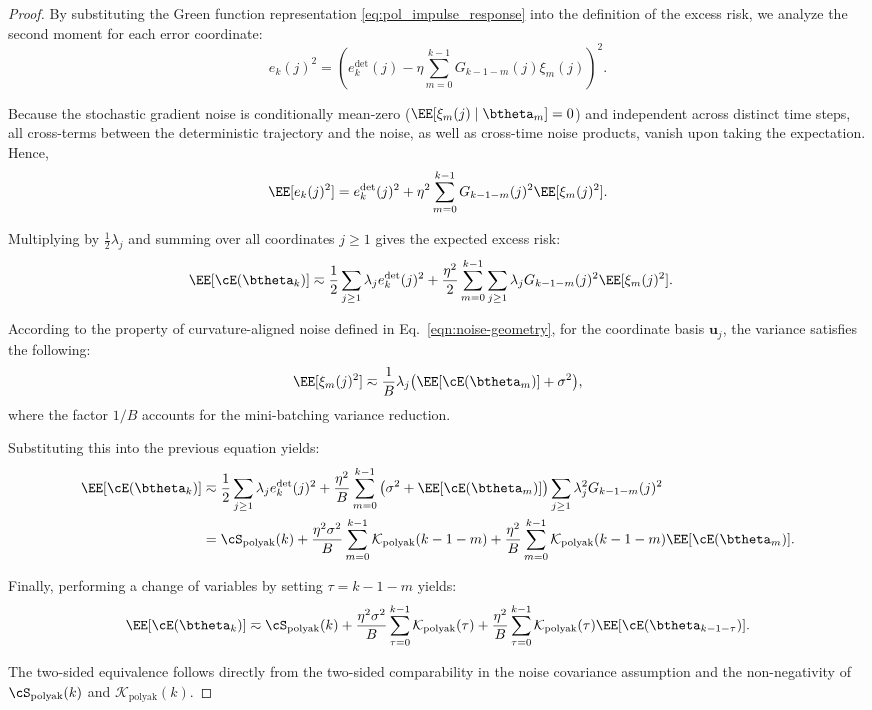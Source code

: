 \documentclass[11pt]{article}
\newcommand{\polyak}{\mathrm{polyak}}
\begin{document}
\begin{proof}

By substituting the Green function representation \eqref{eq:pol_impulse_response} into the definition of the excess risk, we analyze the second moment for each error coordinate:
\[
    e_k(j)^2
    =
    \left( e_k^{\mathrm{det}}(j)
    -\eta\sum_{m=0}^{k-1}G_{k-1-m}(j)\xi_m(j) \right)^2.
\]

Because the stochastic gradient noise is conditionally mean-zero ($\EE[\xi_m(j) \mid \btheta_m] = 0$) and independent across distinct time steps, all cross-terms between the deterministic trajectory and the noise, as well as cross-time noise products, vanish upon taking the expectation. Hence,
\[
    \EE[e_k(j)^2]
    =
    e_k^{\mathrm{det}}(j)^2
    +
    \eta^2\sum_{m=0}^{k-1}G_{k-1-m}(j)^2\EE[\xi_m(j)^2].
\]

Multiplying by $\frac{1}{2}\lambda_j$ and summing over all coordinates $j \ge 1$ gives the expected excess risk:
\begin{align*}
    \EE[\cE(\btheta_k)]
    &\eqsim
    \frac{1}{2} \sum_{j\ge1}\lambda_j e_k^{\mathrm{det}}(j)^2
    +
    \frac{\eta^2}{2}\sum_{m=0}^{k-1}\sum_{j\ge1}
    \lambda_j G_{k-1-m}(j)^2\EE[\xi_m(j)^2].
\end{align*}

According to the property of curvature-aligned noise defined in Eq.~\eqref{eqn:noise-geometry}, for the coordinate basis $\bm{u}_j$, the variance satisfies the following:
\[
    \EE[\xi_m(j)^2]
    \eqsim
    \frac{1}{B}\lambda_j\big(\EE[\cE(\btheta_m)] + \sigma^2\big),
\]
where the factor $1/B$ accounts for the mini-batching variance reduction. 

Substituting this into the previous equation yields:
\begin{align*}
    \EE[\cE(\btheta_k)]
    &\eqsim
    \frac{1}{2} \sum_{j\ge1}\lambda_j e_k^{\mathrm{det}}(j)^2
    +
    \frac{\eta^2}{B}\sum_{m=0}^{k-1}
    \big(\sigma^2+\EE[\cE(\btheta_m)]\big)
    \sum_{j\ge1}\lambda_j^2 G_{k-1-m}(j)^2  \\
    &=
    \cS_{\polyak}(k)
    +
    \frac{\eta^2\sigma^2}{B}\sum_{m=0}^{k-1}\mathcal K_{\polyak}(k-1-m)
    +
    \frac{\eta^2}{B}\sum_{m=0}^{k-1}\mathcal K_{\polyak}(k-1-m)\EE[\cE(\btheta_m)].
\end{align*}

Finally, performing a change of variables by setting $\tau = k-1-m$ yields:
\[
    \EE[\cE(\btheta_k)]
    \eqsim
    \cS_{\polyak}(k)
    +
    \frac{\eta^2\sigma^2}{B}\sum_{\tau=0}^{k-1}\mathcal{K}_{\polyak}(\tau)
    +
    \frac{\eta^2}{B}\sum_{\tau=0}^{k-1}\mathcal{K}_{\polyak}(\tau)\EE[\cE(\btheta_{k-1-\tau})].
\]

The two-sided equivalence follows directly from the two-sided comparability in the noise covariance assumption and the non-negativity of $\cS_{\polyak}(k)$ and $\mathcal K_{\polyak}(k)$.
\end{proof}
\end{document}
